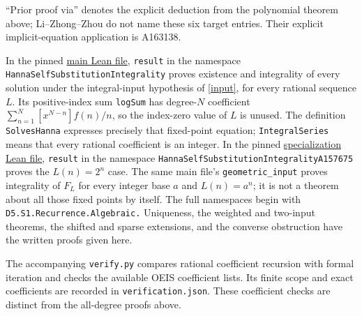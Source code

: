\documentclass[11pt]{article}
\begin{document}
``Prior proof via'' denotes the explicit deduction from the polynomial
theorem above; Li--Zhong--Zhou do not name these six target entries.
Their explicit implicit-equation application is A163138.

In the pinned
\href{https://github.com/the-omega-institute/trureturing/blob/91f44a2b8e396fd6374dd8ae047c158afbbebba4/D5/S1/Recurrence/Algebraic/HannaSelfSubstitutionIntegrality.lean}{main Lean file},
\texttt{result} in the namespace
\texttt{HannaSelfSubstitutionIntegrality}
proves existence and integrality of every solution under the integral-input
hypothesis of \eqref{input}, for every rational sequence $L$.
Its positive-index sum \texttt{logSum} has degree-$N$ coefficient
$\sum_{n=1}^N[x^{N-n}]f(n)/n$, so the index-zero value of $L$ is unused.
The definition \texttt{SolvesHanna} expresses precisely that fixed-point equation;
\texttt{IntegralSeries} means that every rational coefficient is an integer.
In the pinned
\href{https://github.com/the-omega-institute/trureturing/blob/91f44a2b8e396fd6374dd8ae047c158afbbebba4/D5/S1/Recurrence/Algebraic/HannaSelfSubstitutionIntegralityA157675.lean}{specialization Lean file},
\texttt{result} in the namespace
\texttt{HannaSelfSubstitutionIntegralityA157675}
proves the $L(n)=2^n$ case. The same main file's \texttt{geometric\_input}
proves integrality of $F_L$ for every integer base $a$ and $L(n)=a^n$;
it is not a theorem about all those fixed points by itself.
The full namespaces begin with \texttt{D5.S1.Recurrence.Algebraic.}
Uniqueness, the weighted and two-input theorems, the shifted and sparse
extensions, and the converse obstruction have the written proofs given here.

The accompanying \texttt{verify.py} compares rational coefficient recursion with
formal iteration and checks the available OEIS coefficient lists. Its finite
scope and exact coefficients are recorded in \texttt{verification.json}.
These coefficient checks are distinct from the all-degree proofs above.
\end{document}
